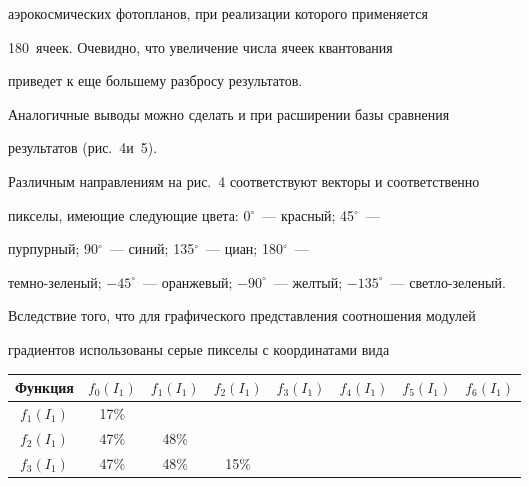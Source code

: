 \begin{multicols}{2}
аэрокосмических фотопланов, при реализации которого применяется\linebreak

180~ячеек. Очевидно, что увеличение числа ячеек квантования

приведет к еще большему разбросу результатов.



  Аналогичные выводы можно сделать и при расширении базы сравнения

результатов (рис.~4\linebreak и~5).



  Различным направлениям на рис.~4 соответствуют векторы и соответственно

пикселы, имеющие следующие цвета: 0$^\circ$~--- красный; 45$^\circ$~---

пурпурный; 90$^\circ$~--- синий; 135$^\circ$~--- циан; 180$^\circ$~---

  тем\-но-зе\-ле\-ный; $-45^\circ$~--- оранжевый; $-90^\circ$~--- желтый; $-

135^\circ$~--- свет\-ло-зе\-леный.



  Вследствие того, что для графического пред\-став\-ле\-ния соотношения модулей

градиентов использованы серые пикселы с координатами вида



  \begin{table}[b]\small %

  \begin{center}


  \vspace*{2ex}



  \begin{tabular}{|c|c|c|c|c|c|c|c|}

  \hline

\multicolumn{1}{|c|}{Функция}&$f_0(I_1)$&$f_1(I_1)$&$f_2(I_1)$&$f_3(I_1)$&$f_4(I_1)$&$f_5(I_1)$&$f_6(I_1)$\\

\hline

$f_1(I_1)$&17\%&&&&&&\\

$f_2(I_1)$&47\%&48\%&&&&&\\

$f_3(I_1)$&47\%&48\%&15\%&&&&\\


\end{tabular}
\end{center}
\end{table}
\end{multicols}
